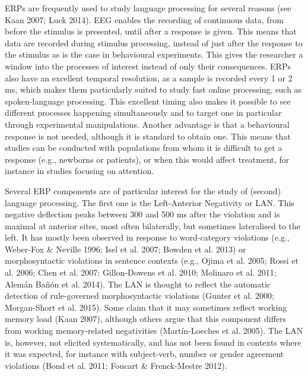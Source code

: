 \documentclass[11pt]{article}
\newenvironment{styleStandard}{\renewcommand\baselinestretch{1.0}\setlength\leftskip{0cm}\setlength\rightskip{0cm plus 1fil}\setlength\parindent{0cm}\setlength\parfillskip{0pt plus 1fil}\setlength\parskip{0in plus 1pt}\writerlistparindent\writerlistleftskip\leavevmode\normalfont\normalsize\writerlistlabel\ignorespaces}{\unskip\vspace{0.111in plus 0.0111in}\par}
\newcommand\writerlistleftskip{}
\newcommand\writerlistparindent{}
\newcommand\writerlistlabel{}
\begin{document}
\begin{styleStandard}
ERPs are frequently used to study language processing for several reasons (see Kaan 2007; Luck 2014). EEG enables the recording of continuous data, from before the stimulus is presented, until after a response is given. This means that data are recorded during\textit{ }stimulus processing, instead of just after the response to the stimulus as is the case in behavioural experiments. This gives the researcher a window into the processes of interest instead of only their consequences. ERPs also have an excellent temporal resolution, as a sample is recorded every 1 or 2 ms, which makes them particularly suited to study fast online processing, such as spoken-language processing. This excellent timing also makes it possible to see different processes happening simultaneously and to target one in particular through experimental manipulations. Another advantage is that a behavioural response is not needed, although it is standard to obtain one. This means that studies can be conducted with populations from whom it is difficult to get a response (e.g., newborns or patients), or when this would affect treatment, for instance in studies focusing on attention.
\end{styleStandard}

\begin{styleStandard}
Several ERP components are of particular interest for the study of (second) language processing. The first one is the Left-Anterior Negativity or LAN. This negative deflection peaks between 300 and 500 ms after the violation and is maximal at anterior sites, most often bilaterally, but sometimes lateralised to the left. It has mostly been observed in response to word-category violations (e.g., Weber-Fox \& Neville 1996; Isel et al. 2007; Bowden et al. 2013) or morphosyntactic violations in sentence contexts (e.g., Ojima et al. 2005; Rossi et al. 2006; Chen et al. 2007; Gillon-Dowens et al. 2010; Molinaro et al. 2011; Alemán Bañón et al. 2014). The LAN is thought to reflect the automatic detection of rule-governed morphosyntactic violations (Gunter et al. 2000; Morgan-Short et al. 2015). Some claim that it may sometimes reflect working memory load (Kaan 2007), although others argue that this component differs from working memory-related negativities (Martín-Loeches et al. 2005). The LAN is, however, not elicited systematically, and has not been found in contexts where it was expected, for instance with subject-verb, number or gender agreement violations (Bond et al. 2011; Foucart \& Frenck-Mestre 2012). 
\end{styleStandard}
\end{document}
